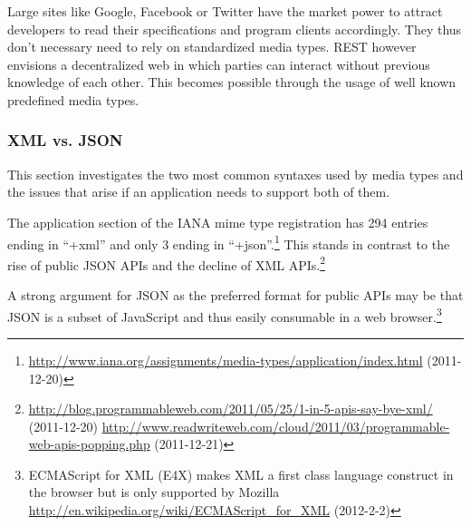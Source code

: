 \documentclass[12pt,a4paper]{scrartcl}		%
\newcommand{\citeurl}[2]{\url{#1} (#2)}
\begin{document}
Large sites like Google, Facebook or Twitter have the market power to attract
developers to read their specifications and program clients accordingly. They
thus don't necessary need to rely on standardized media types. REST however
envisions a decentralized web in which parties can interact without previous
knowledge of each other. This becomes possible through the usage of well known
predefined media types.


\subsubsection{XML vs. JSON}


This section investigates the two most common syntaxes used by media types
and the issues that arise if an application needs to support both of them.

The application section of the IANA mime type registration has 294 entries
ending in ``+xml'' and only 3 ending in
``+json''.\footnote{\citeurl{http://www.iana.org/assignments/media-types/application/index.html}{2011-12-20}}
This stands in contrast to the rise of public JSON APIs and the decline of XML
APIs.\footnote{\citeurl{http://blog.programmableweb.com/2011/05/25/1-in-5-apis-say-bye-xml/}{2011-12-20} \citeurl{http://www.readwriteweb.com/cloud/2011/03/programmable-web-apis-popping.php}{2011-12-21}}

A strong argument for JSON as the preferred format for public APIs may be that
JSON is a subset of JavaScript and thus easily consumable in a web
browser.\footnote{ECMAScript for XML (E4X) makes XML a first class language
  construct in the browser but is only supported by Mozilla
  \citeurl{http://en.wikipedia.org/wiki/ECMAScript_for_XML}{2012-2-2}}
\end{document}
